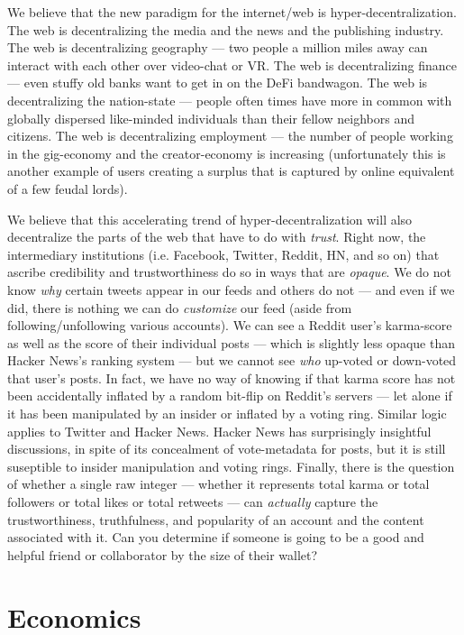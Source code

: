 \documentclass[a4paper]{article}
\begin{document}
We believe that the new paradigm for the internet/web is hyper-decentralization. The web is decentralizing the media and the news and the publishing industry. The web is decentralizing geography ---  two people a million miles away can interact with each other over video-chat or VR. The web is decentralizing finance ---  even stuffy old banks want to get in on the DeFi bandwagon. The web is decentralizing the nation-state ---  people often times have more in common with globally dispersed like-minded individuals than their fellow neighbors and citizens. The web is decentralizing employment ---  the number of people working in the gig-economy and the creator-economy is increasing (unfortunately this is another example of users creating a surplus that is captured by online equivalent of a few feudal lords).

We believe that this accelerating trend of hyper-decentralization will also decentralize the parts of the web that have to do with \emph{trust}. Right now, the intermediary institutions (i.e. Facebook, Twitter, Reddit, HN, and so on) that ascribe credibility and trustworthiness do so in ways that are \emph{opaque}. We do not know \emph{why} certain tweets appear in our feeds and others do not ---  and even if we did, there is nothing we can do \emph{customize} our feed (aside from following/unfollowing various accounts). We can see a Reddit user's karma-score as well as the score of their individual posts ---  which is slightly less opaque than Hacker News's ranking system ---  but we cannot see \emph{who} up-voted or down-voted that user's posts. In fact, we have no way of knowing if that karma score has not been accidentally inflated by a random bit-flip on Reddit's servers ---  let alone if it has been manipulated by an insider or inflated by a voting ring. Similar logic applies to Twitter and Hacker News. Hacker News has surprisingly insightful discussions, in spite of its concealment of vote-metadata for posts, but it is still suseptible to insider manipulation and voting rings. Finally, there is the question of whether a single raw integer ---  whether it represents total karma or total followers or total likes or total retweets ---  can \emph{actually} capture the trustworthiness, truthfulness, and popularity of an account and the content associated with it. Can you determine if someone is going to be a good and helpful friend or collaborator by the size of their wallet?
\section{Economics}
\label{Economics}
\end{document}
